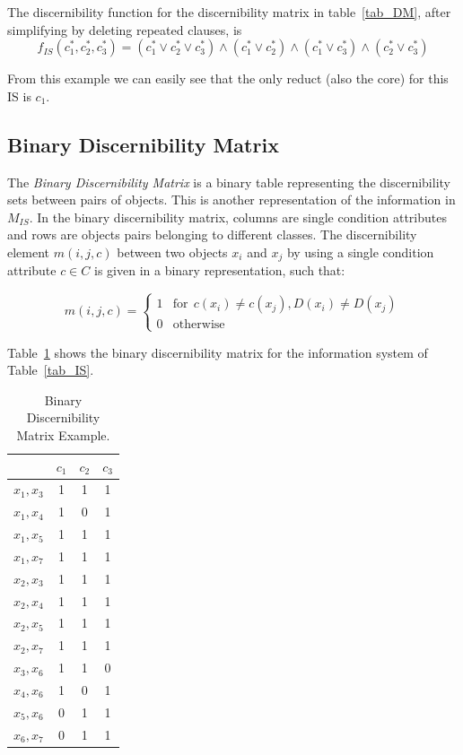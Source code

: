 \documentclass[authoryear,11pt]{elsarticle}
\begin{document}
  The discernibility function for the discernibility matrix in table~\ref{tab_DM}, after simplifying by 
  deleting repeated clauses, is  
  $$f_{IS}(c_1^*,c_2^*,c_3^*)=(c_1^* \vee c_2^* \vee c_3^*) \wedge (c_1^* \vee c_2^*) 
   \wedge (c_1^* \vee c_3^*) \wedge (c_2^* \vee c_3^*) $$
  
  From this example we can easily see that the only reduct (also the core) for this IS is $c_1$.
  
\subsection{Binary Discernibility Matrix}
  The \textit{Binary Discernibility Matrix} is a binary table representing the discernibility sets between pairs 
  of objects. This is another representation of the information in $M_{IS}$. In the binary discernibility
  matrix, columns are single condition attributes and rows are objects pairs belonging to different classes.
  The discernibility element $m(i, j, c)$ between two objects $x_i$ and $x_j$ by using a single condition 
  attribute $c \in C$ is given in a binary representation, such that:
  
  \begin{equation}
  	m(i, j, c)=\left\lbrace\begin{array}{cl}
  			1 & \mathrm{for~~}c(x_i) \neq c(x_j),D(x_i) \neq D(x_j)\\
  			0 								   & \mathrm{otherwise} 
  	\end{array}\right.
  \end{equation} 
  
  Table~\ref{tab_BDM} shows the binary discernibility matrix for the information system of Table~\ref{tab_IS}.  
  
  \begin{table}[htb]
		\caption{Binary Discernibility Matrix Example.} \label{tab_BDM}
		\centering
 	\begin{tabular}{cccc}
 		& $c_1$ & $c_2$ & $c_3$\\
 		\hline
		$x_1,x_3$ & 1 & 1 & 1 \\
		$x_1,x_4$ & 1 & 0 & 1 \\
		$x_1,x_5$ & 1 & 1 & 1 \\
		$x_1,x_7$ & 1 & 1 & 1 \\
		$x_2,x_3$ & 1 & 1 & 1 \\
		$x_2,x_4$ & 1 & 1 & 1 \\
		$x_2,x_5$ & 1 & 1 & 1 \\
		$x_2,x_7$ & 1 & 1 & 1 \\
		$x_3,x_6$ & 1 & 1 & 0 \\
		$x_4,x_6$ & 1 & 0 & 1 \\
		$x_5,x_6$ & 0 & 1 & 1 \\
		$x_6,x_7$ & 0 & 1 & 1 
 	\end{tabular}             
  \end{table}
  
\end{document}
